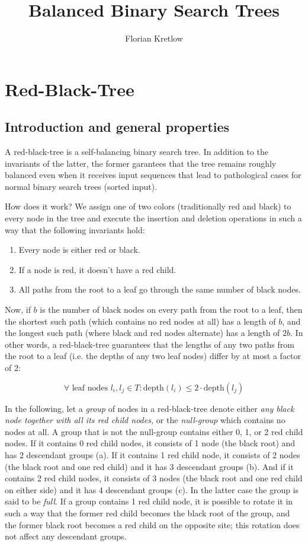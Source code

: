 \documentclass{article}
\title{Balanced Binary Search Trees}
\author{Florian Kretlow}
\begin{document}
\section{Red-Black-Tree}

\subsection{Introduction and general properties}
A red-black-tree is a self-balancing binary search tree. In addition to the invariants
of the latter, the former garantees that the tree remains roughly balanced even when it
receives input sequences that lead to pathological cases for normal binary search trees
(sorted input).

How does it work? We assign one of two colors (traditionally red and black) to every
node in the tree and execute the insertion and deletion operations in such a way that the
following invariants hold:

\begin{enumerate}[label=(\arabic*)]
\item Every node is either red or black.
\item If a node is red, it doesn't have a red child.
\item All paths from the root to a leaf go through the same number of black nodes.
\end{enumerate}

Now, if \(b\) is the number of black nodes on every path from the root to a leaf, then
the shortest such path (which contains no red nodes at all) has a length of \(b\), and
the longest such path (where black and red nodes alternate) has a length of
\(2b\). In other words, a red-black-tree guarantees that the lengths of any two paths
from the root to a leaf (i.e. the depths of any two leaf nodes) differ by at most a
factor of 2:

\[
\forall \text{ leaf nodes } l_{i}, l_{j} \in T : \text{depth}(l_i) \leq 2 \cdot
\text{depth}(l_j)
\]

In the following, let a \emph{group} of nodes in a red-black-tree denote either
\emph{any black node together with all its red child nodes,} or the \emph{null-group}
which contains no nodes at all.  A group that is not the null-group contains either 0,
1, or 2 red child nodes.  If it contains 0 red child nodes, it consists of 1 node (the
black root) and has 2 descendant groups (a). If it contains 1 red child node, it
consists of 2 nodes (the black root and one red child) and it has 3 descendant groups
(b). And if it contains 2 red child nodes, it consists of 3 nodes (the black root and
one red child on either side) and it has 4 descendant groups (c). In the latter case the
group is said to be \emph{full}. If a group contains 1 red child node, it is possible to
rotate it in such a way that the former red child becomes the black root of the group,
and the former black root becomes a red child on the opposite site; this rotation does
not affect any descendant groups.
\end{document}
